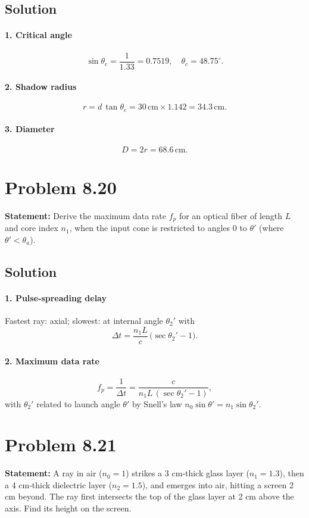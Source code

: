 \subsection*{Solution}
\paragraph{1. Critical angle}
\[
\sin\theta_c = \frac{1}{1.33} = 0.7519,\quad \theta_c = 48.75^\circ.
\]
\paragraph{2. Shadow radius}
\[
r = d\,\tan\theta_c = 30\,\mathrm{cm}\times1.142 = 34.3\,\mathrm{cm}.
\]
\paragraph{3. Diameter}
\[
D = 2r = 68.6\,\mathrm{cm}.
\]

\section*{Problem 8.20}
\textbf{Statement:} Derive the maximum data rate $f_p$ for an optical fiber of length $L$ and core index $n_1$, when the input cone is restricted to angles $0$ to $\theta'$ (where $\theta' < \theta_a$).

\subsection*{Solution}
\paragraph{1. Pulse‐spreading delay}
Fastest ray: axial; slowest: at internal angle $\theta_2'$ with
\[
\Delta t = \frac{n_1 L}{c}\,\bigl(\sec\theta_2' - 1\bigr).
\]
\paragraph{2. Maximum data rate}
\[
f_p = \frac{1}{\Delta t}
= \frac{c}{n_1 L\,(\sec\theta_2' - 1)},
\]
with $\theta_2'$ related to launch angle $\theta'$ by Snell’s law $n_0 \sin\theta' = n_1 \sin\theta_2'$.


\section*{Problem 8.21}
\textbf{Statement:} A ray in air ($n_0=1$) strikes a 3 cm‐thick glass layer ($n_1=1.3$), then a 4 cm‐thick dielectric layer ($n_2=1.5$), and emerges into air, hitting a screen 2 cm beyond. The ray first intersects the top of the glass layer at 2 cm above the axis. Find its height on the screen.


